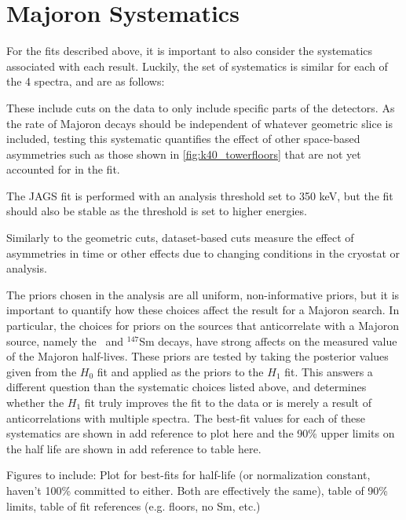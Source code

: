 \section{Majoron Systematics}
For the fits described above, it is important to also consider the systematics associated with each result.
Luckily, the set of systematics is similar for each of the 4 spectra, and are as follows:
\begin{description}[align=left]
\item [Geometric cuts] These include cuts on the data to only include specific parts of the detectors.
As the rate of Majoron decays should be independent of whatever geometric slice is included, testing this systematic quantifies the effect of other space-based asymmetries such as those shown in \autoref{fig:k40_towerfloors} that are not yet accounted for in the fit. 
\item[Analysis thresholds] The JAGS fit is performed with an analysis threshold set to 350 keV, but the fit should also be stable as the threshold is set to higher energies.
\item [Dataset-based cuts] Similarly to the geometric cuts, dataset-based cuts measure the effect of asymmetries in time or other effects due to changing conditions in the cryostat or analysis.
\item [Choice of priors] The priors chosen in the analysis are all uniform, non-informative priors, but it is important to quantify how these choices affect the result for a Majoron search.
In particular, the choices for priors on the sources that anticorrelate with a Majoron source, namely the \twonubb~and $^{147}$Sm decays, have strong affects on the measured value of the Majoron half-lives.
These priors are tested by taking the posterior values given from the $H_0$ fit and applied as the priors to the $H_1$ fit.
This answers a different question than the systematic choices listed above, and determines whether the $H_1$ fit truly improves the fit to the data or is merely a result of anticorrelations with multiple spectra.
The best-fit values for each of these systematics are shown in \color{red}add reference to plot here\color{black} and the 90\% upper limits on the half life are shown in \color{red}add reference to table here\color{black}.

Figures to include:
Plot for best-fits for half-life (or normalization constant, haven't 100\% committed to either. Both are effectively the same), table of 90\% limits, table of fit references (e.g. floors, no Sm, etc.)
\end{description}
